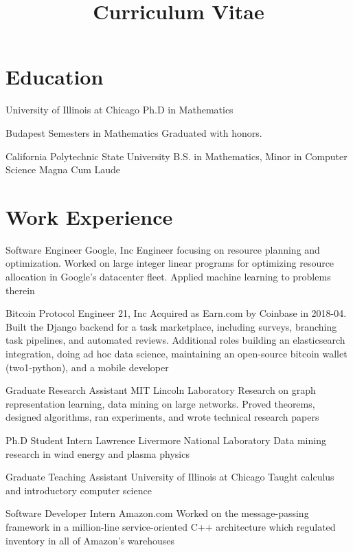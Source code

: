 \documentclass[11pt]{moderncv}
\title{Curriculum Vitae}
\begin{document}
\maketitle


\section{Education}

  {University of Illinois at Chicago}
  {}
  {Ph.D in Mathematics}
  {}
  {}


  {Budapest Semesters in Mathematics}
  {}
  {}
  {}
  {Graduated with honors.}


  {California Polytechnic State University}
  {}
  {B.S. in Mathematics, Minor in Computer Science}
  {}
  {Magna Cum Laude}


\section{Work Experience}

  {Software Engineer}
  {Google, Inc}
  {}
  {}
  {Engineer focusing on resource planning and optimization. Worked on large integer linear programs for optimizing resource allocation in Google's datacenter fleet. Applied machine learning to problems therein}

  {Bitcoin Protocol Engineer}
  {21, Inc}
  {}
  {}
  {Acquired as Earn.com by Coinbase in 2018-04. Built the Django backend for a task marketplace, including surveys, branching task pipelines, and automated reviews. Additional roles building an elasticsearch integration, doing ad hoc data science, maintaining an open-source bitcoin wallet (two1-python), and a mobile developer}

  {Graduate Research Assistant}
  {MIT Lincoln Laboratory}
  {}
  {}
  {Research on graph representation learning, data mining on large networks. Proved theorems, designed algorithms, ran experiments, and wrote technical research papers}

  {Ph.D Student Intern}
  {Lawrence Livermore National Laboratory}
  {}
  {}
  {Data mining research in wind energy and plasma physics}

  {Graduate Teaching Assistant}
  {University of Illinois at Chicago}
  {}
  {}
  {Taught calculus and introductory computer science}

  {Software Developer Intern}
  {Amazon.com}
  {}
  {}
  {Worked on the message-passing framework in a million-line service-oriented C++ architecture which regulated inventory in all of Amazon's warehouses}
\end{document}
